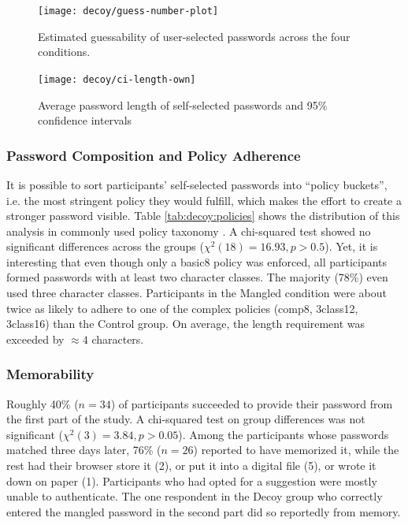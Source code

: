\begin{figure}
	\centering
	\texttt{[image: decoy/guess-number-plot]}
	\caption{\label{fig:decoy:guess-number-plot} Estimated guessability of user-selected passwords across the four conditions.}
\end{figure}

\begin{figure}
	\centering
	\texttt{[image: decoy/ci-length-own]}
	\caption{\label{fig:decoy:ci-length-own} Average password length of self-selected passwords and 95\% confidence intervals}
\end{figure}


\subsubsection{Password Composition and Policy Adherence}
It is possible to sort participants' self-selected passwords into ``policy buckets'', i.e. the most stringent policy they would fulfill, which makes the effort to create a stronger password visible. Table \ref{tab:decoy:policies} shows the distribution of this analysis in commonly used policy taxonomy \cite{Shay2014CanLongPasswordsBeSecureAndUsable}. 
A chi-squared test showed no significant differences across the groups ($\chi^2(18)=16.93,p>0.5$). Yet, it is interesting that even though only a basic8 policy was enforced, all participants formed passwords with at least two character classes. The majority (78\%) even used three character classes. Participants in the Mangled condition were about twice as likely to adhere to one of the complex policies (comp8, 3class12, 3class16) than the Control group. On average, the length requirement was exceeded by $\approx 4$ characters. 

\subsubsection{Memorability}
Roughly 40\% ($n=34$) of participants succeeded to provide their password from the first part of the study. A chi-squared test on group differences was not significant ($\chi^2(3)=3.84,p>0.05$). Among the participants whose passwords matched three days later, 76\% ($n=26$) reported to have memorized it, while the rest had their browser store it (2), or put it into a digital file (5), or wrote it down on paper (1). Participants who had opted for a suggestion were mostly unable to authenticate. The one respondent in the Decoy group who correctly entered the mangled password in the second part did so reportedly from memory. %

